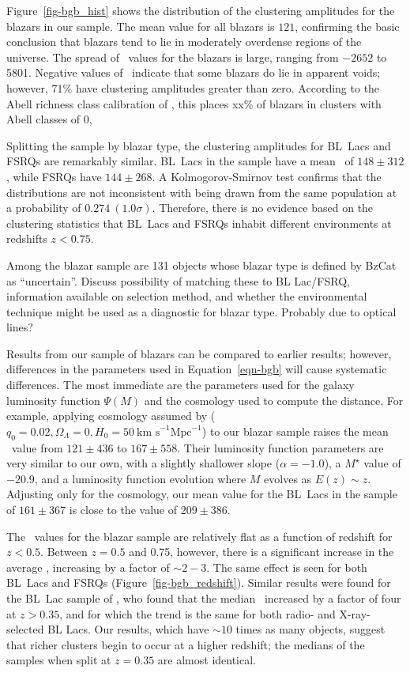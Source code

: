 \documentclass{emulateapj}
\begin{document}
Figure~\ref{fig-bgb_hist} shows the distribution of the clustering amplitudes for the blazars in our sample. The mean value for all blazars is $121$, confirming the basic conclusion that blazars tend to lie in moderately overdense regions of the universe. The spread of \bgb~values for the blazars is large, ranging from $-2652$ to 5801. Negative values of \bgb~indicate that some blazars do lie in apparent voids; however, 71\% have clustering amplitudes greater than zero. According to the Abell richness class calibration of \citet{yee99}, this places xx\% of blazars in clusters with Abell classes of 0, 

Splitting the sample by blazar type, the clustering amplitudes for BL~Lacs and FSRQs are remarkably similar. BL~Lacs in the sample have a mean \bgb~of $148\pm312$, while FSRQs have $144\pm268$. A Kolmogorov-Smirnov test confirms that the distributions are not inconsistent with being drawn from the same population at a probability of $0.274~(1.0\sigma)$. Therefore, there is no evidence based on the clustering statistics that BL~Lacs and FSRQs inhabit different environments at redshifts $z<0.75$. 

Among the blazar sample are 131 objects whose blazar type is defined by BzCat as ``uncertain''. Discuss possibility of matching these to BL Lac/FSRQ, information available on selection method, and whether the environmental technique might be used as a diagnostic for blazar type. Probably due to optical lines?

Results from our sample of blazars can be compared to earlier results; however, differences in the parameters used in Equation~\ref{eqn-bgb} will cause systematic differences. The most immediate are the parameters used for the galaxy luminosity function $\Psi(M)$ and the cosmology used to compute the distance. For example, applying cosmology assumed by \citet{wur97} ($q_0=0.02, \Omega_\Lambda=0, H_0=50~\mbox{km s}^{-1}\mbox{Mpc}^{-1}$) to our blazar sample raises the mean \bgb~value from $121\pm436$ to $167\pm558$. Their luminosity function parameters are very similar to our own, with a slightly shallower slope ($\alpha=-1.0$), a $M^\star$ value of $-20.9$, and a luminosity function evolution where $M$ evolves as $E(z)\sim z$. Adjusting only for the cosmology, our mean value for the BL~Lacs in the sample of $161\pm367$ is close to the \citet{wur97} value of $209\pm386$. 

The \bgb~values for the blazar sample are relatively flat as a function of redshift for $z<0.5$. Between $z=0.5$ and 0.75, however, there is a significant increase in the average \bgb, increasing by a factor of $\sim2-3$. The same effect is seen for both BL~Lacs and FSRQs (Figure~\ref{fig-bgb_redshift}). Similar results were found for the BL~Lac sample of \citet{wur97}, who found that the median \bgb~increased by a factor of four at $z>0.35$, and for which the trend is the same for both radio- and X-ray-selected BL Lacs. Our results, which have $\sim10$ times as many objects, suggest that richer clusters begin to occur at a higher redshift; the medians of the samples when split at $z=0.35$ are almost identical. 
\end{document}
